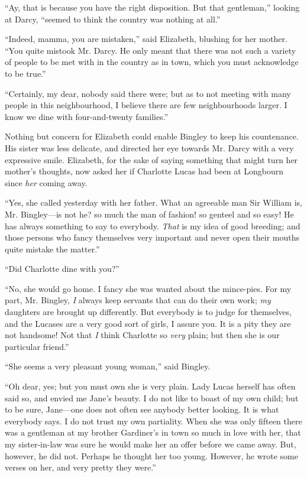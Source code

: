 \documentclass[12pt,openright]{book}
\begin{document}
“Ay, that is because you have the right disposition. But that gentleman,” looking at Darcy, “seemed to think the country was nothing at all.”

“Indeed, mamma, you are mistaken,” said Elizabeth, blushing for her mother. “You quite mistook Mr. Darcy. He only meant that there was not such a variety of people to be met with in the country as in town, which you must acknowledge to be true.”

“Certainly, my dear, nobody said there were; but as to not meeting with many people in this neighbourhood, I believe there are few neighbourhoods larger. I know we dine with four-and-twenty families.”

Nothing but concern for Elizabeth could enable Bingley to keep his countenance. His sister was less delicate, and directed her eye towards Mr. Darcy with a very expressive smile. Elizabeth, for the sake of saying something that might turn her mother’s thoughts, now asked her if Charlotte Lucas had been at Longbourn since \textit{her} coming away.

“Yes, she called yesterday with her father. What an agreeable man Sir William is, Mr. Bingley—is not he? so much the man of fashion! so genteel and so easy! He has always something to say to everybody. \textit{That} is my idea of good breeding; and those persons who fancy themselves very important and never open their mouths quite mistake the matter.”

“Did Charlotte dine with you?”

“No, she would go home. I fancy she was wanted about the mince-pies. For my part, Mr. Bingley, \textit{I} always keep servants that can do their own work; \textit{my} daughters are brought up differently. But everybody is to judge for themselves, and the Lucases are a very good sort of girls, I assure you. It is a pity they are not handsome! Not that \textit{I} think Charlotte so \textit{very} plain; but then she is our particular friend.”

“She seems a very pleasant young woman,” said Bingley.

“Oh dear, yes; but you must own she is very plain. Lady Lucas herself has often said so, and envied me Jane’s beauty. I do not like to boast of my own child; but to be sure, Jane—one does not often see anybody better looking. It is what everybody says. I do not trust my own partiality. When she was only fifteen there was a gentleman at my brother Gardiner’s in town so much in love with her, that my sister-in-law was sure he would make her an offer before we came away. But, however, he did not. Perhaps he thought her too young. However, he wrote some verses on her, and very pretty they were.”
\end{document}
